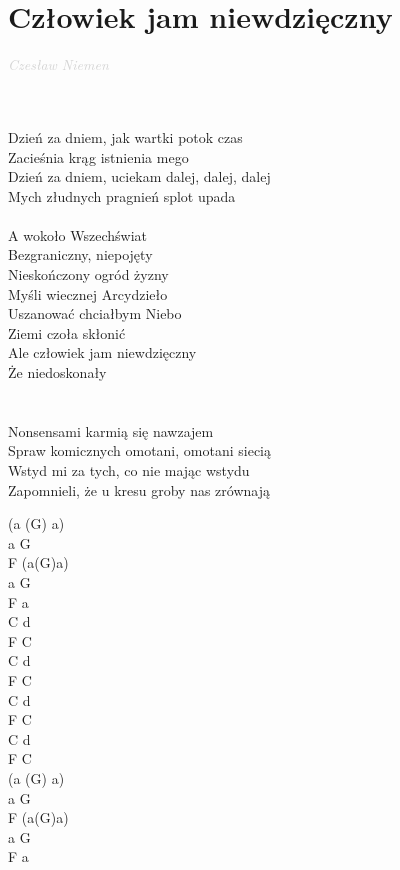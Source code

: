 \documentclass[a5paper, 10pt]{book}
\begin{document}
\section{Człowiek jam niewdzięczny}\textcolor{lightgray}{\textit{Czesław Niemen}}\\~\\
\begin{minipage}[t]{0.6\textwidth}
~\\
Dzień za dniem, jak wartki potok czas\\
Zacieśnia krąg istnienia mego\\
Dzień za dniem, uciekam dalej, dalej, dalej\\
Mych złudnych pragnień splot upada\\
\\
\hspace*{5mm}A wokoło Wszechświat\\
\hspace*{5mm}Bezgraniczny, niepojęty\\
\hspace*{5mm}Nieskończony ogród żyzny\\
\hspace*{5mm}Myśli wiecznej Arcydzieło\\
\hspace*{5mm}Uszanować chciałbym Niebo\\
\hspace*{5mm}Ziemi czoła skłonić\\
\hspace*{5mm}Ale człowiek jam niewdzięczny\\
\hspace*{5mm}Że niedoskonały\\
\\
~\\
Nonsensami karmią się nawzajem\\
Spraw komicznych omotani, omotani siecią\\
Wstyd mi za tych, co nie mając wstydu\\
Zapomnieli, że u kresu groby nas zrównają\\
\end{minipage}
\begin{minipage}[t]{0.4\textwidth}
(a (G) a)\\
a G\\F (a(G)a)\\
a G\\F a\\

C d\\F C\\C d\\F C\\
C d\\F C\\C d\\F C\\

(a (G) a)\\
a G\\F (a(G)a)\\
a G\\F a\\
\end{minipage}
\end{document}
